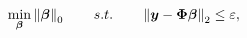 \begin{equation}
\label{eq:Opt-L0}
\min_{\boldsymbol{\beta}} \left\lVert\boldsymbol{\beta}\right\rVert_0 \qquad s.t. \qquad \left\lVert\boldsymbol{y} - \boldsymbol{\Phi} \boldsymbol{\beta}\right\rVert_2 \leq \varepsilon,
\end{equation}
